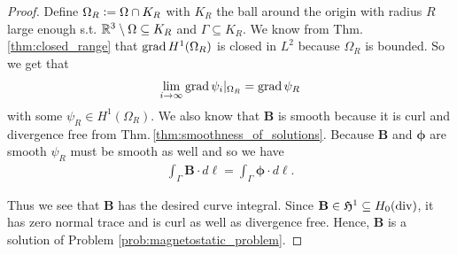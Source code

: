 \documentclass[../master_thesis.tex]{subfiles}
\begin{document}
\begin{proof}
    Define $\Omega_R \vcentcolon= \Omega \cap K_R$ with $K_R$ the ball around the origin 
    with radius $R$ large enough s.t. $\mathbb{R}^3 \setminus \Omega \subseteq K_R$ and 
    $\Gamma \subseteq K_R$. 
    We know from Thm.\,\ref{thm:closed_range} 
    that $\operatorname{grad} H^1(\Omega_R)$ is closed in $L^2$ because $\Omega_R$ is bounded. 
    So we get that 
    \begin{align*}
        \lim\limits_{i\rightarrow \infty}\operatorname{grad} \psi_i|_{\Omega_R} = \operatorname{grad} \psi_R
    \end{align*}
    with some $\psi_R \in H^1(\Omega_R)$. We also know that $\mathbf{B}$ is smooth because 
    it is curl and divergence free from Thm.\,\ref{thm:smoothness_of_solutions}. 
    Because $\mathbf{B}$ and $\bm{\phi}$ are smooth
    $\psi_R$ must be smooth as well and so we have   
    \begin{align*}
        \int_\Gamma \mathbf{B}\cdot d\ell = \int_\Gamma \bm{\phi}\cdot d\ell.
    \end{align*}

    Thus we see that $\mathbf{B}$ has the desired curve integral. Since 
    $\mathbf{B} \in \mathfrak{H}^1 \subseteq H_0(\operatorname{div})$, it has zero normal trace 
    and is curl as well as divergence free. Hence, $\mathbf{B}$ is a solution of Problem 
    \ref{prob:magnetostatic_problem}.
\end{proof}
\end{document}
